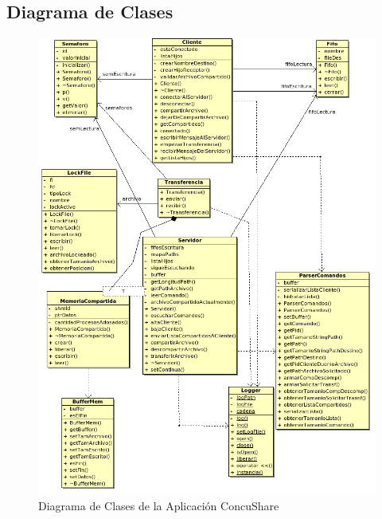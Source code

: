 \documentclass[a4paper,10pt]{article}
\begin{document}
		\subsection{Diagrama de Clases}
			\begin{figure}[!htpb]
				\centering
				\includegraphics[width=12cm]{dclases.png}
				\caption{Diagrama de Clases de la Aplicaci\'on ConcuShare}
			\end{figure}
		
			
			
		
		

				
\end{document}
